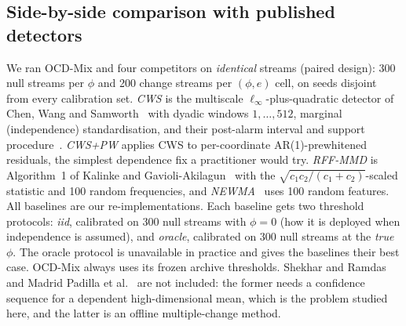 \subsection{Side-by-side comparison with published detectors}\label{sec:baselines}
We ran OCD-Mix and four competitors on \emph{identical} streams (paired design): 300 null streams per $\phi$ and 200 change streams per $(\phi,e)$ cell, on seeds disjoint from every calibration set. \emph{CWS} is the multiscale $\ell_\infty$-plus-quadratic detector of Chen, Wang and Samworth~\cite{chen2022} with dyadic windows $1,\dots,512$, marginal (independence) standardisation, and their post-alarm interval and support procedure~\cite{chen2024}. \emph{CWS+PW} applies CWS to per-coordinate AR(1)-prewhitened residuals, the simplest dependence fix a practitioner would try. \emph{RFF-MMD} is Algorithm~1 of Kalinke and Gavioli-Akilagun~\cite{kalinke2025} with the $\sqrt{c_1c_2/(c_1+c_2)}$-scaled statistic and 100 random frequencies, and \emph{NEWMA}~\cite{keriven2020} uses 100 random features. All baselines are our re-implementations. Each baseline gets two threshold protocols: \emph{iid}, calibrated on 300 null streams with $\phi=0$ (how it is deployed when independence is assumed), and \emph{oracle}, calibrated on 300 null streams at the \emph{true} $\phi$. The oracle protocol is unavailable in practice and gives the baselines their best case. OCD-Mix always uses its frozen archive thresholds. Shekhar and Ramdas~\cite{shekhar2024} and Madrid Padilla et al.~\cite{padilla2023} are not included: the former needs a confidence sequence for a dependent high-dimensional mean, which is the problem studied here, and the latter is an offline multiple-change method.

